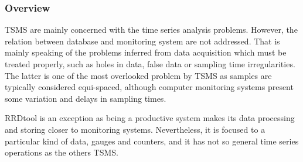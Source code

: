 \subsubsection{Overview}

TSMS are mainly concerned with the time series analysis problems. However, the relation between database and monitoring system are not addressed. That is mainly speaking of the problems inferred from data acquisition which  must be treated properly, such as holes in data, false data or sampling time irregularities. 
The latter is one of the most overlooked problem by TSMS as samples are typically considered equi-spaced, although computer monitoring systems present some variation and delays in sampling times. 

RRDtool is an exception as being a productive system makes its data processing and storing closer to monitoring systems. Nevertheless, it is focused to a particular kind of data, gauges and counters, and it has not so general time series operations as the others TSMS.









